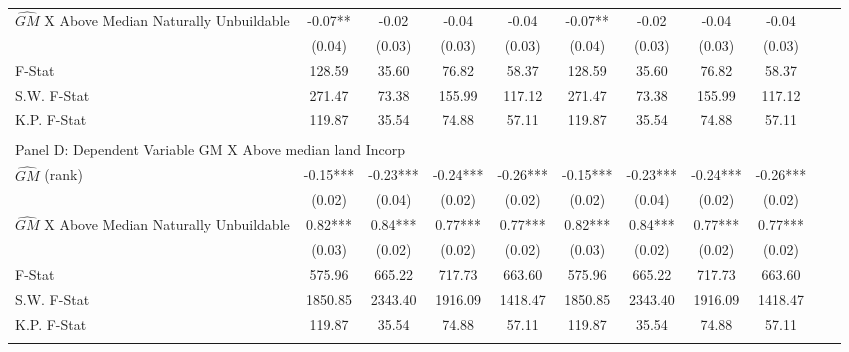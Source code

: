 \begin{table}[htbp]
\begin{threeparttable}
\begin{tabular}{l*{10}{c}}
\addlinespace
$\hat{GM}$ X Above Median Naturally Unbuildable&      -0.07** &      -0.02   &      -0.04   &      -0.04   &      -0.07** &      -0.02   &      -0.04   &      -0.04   \\
                &     (0.04)   &     (0.03)   &     (0.03)   &     (0.03)   &     (0.04)   &     (0.03)   &     (0.03)   &     (0.03)   \\
\midrule
F-Stat          &     128.59   &      35.60   &      76.82   &      58.37   &     128.59   &      35.60   &      76.82   &      58.37   \\
S.W. F-Stat     &     271.47   &      73.38   &     155.99   &     117.12   &     271.47   &      73.38   &     155.99   &     117.12   \\
K.P. F-Stat     &     119.87   &      35.54   &      74.88   &      57.11   &     119.87   &      35.54   &      74.88   &      57.11   \\
\cmidrule[\heavyrulewidth](lr){1-9} \\ \cmidrule[\heavyrulewidth](lr){1-9}
\multicolumn{8}{l}{Panel D: Dependent Variable GM X Above median land Incorp}\\
\cmidrule(lr){1-9}
$\hat{GM}$ (rank)&      -0.15***&      -0.23***&      -0.24***&      -0.26***&      -0.15***&      -0.23***&      -0.24***&      -0.26***\\
                &     (0.02)   &     (0.04)   &     (0.02)   &     (0.02)   &     (0.02)   &     (0.04)   &     (0.02)   &     (0.02)   \\
\addlinespace
$\hat{GM}$ X Above Median Naturally Unbuildable&       0.82***&       0.84***&       0.77***&       0.77***&       0.82***&       0.84***&       0.77***&       0.77***\\
                &     (0.03)   &     (0.02)   &     (0.02)   &     (0.02)   &     (0.03)   &     (0.02)   &     (0.02)   &     (0.02)   \\
\midrule
F-Stat          &     575.96   &     665.22   &     717.73   &     663.60   &     575.96   &     665.22   &     717.73   &     663.60   \\
S.W. F-Stat     &    1850.85   &    2343.40   &    1916.09   &    1418.47   &    1850.85   &    2343.40   &    1916.09   &    1418.47   \\
K.P. F-Stat     &     119.87   &      35.54   &      74.88   &      57.11   &     119.87   &      35.54   &      74.88   &      57.11   \\
\cmidrule[\heavyrulewidth](lr){1-9} \\ \cmidrule[\heavyrulewidth](lr){1-9}

\end{tabular}
\end{threeparttable}
\end{table}
